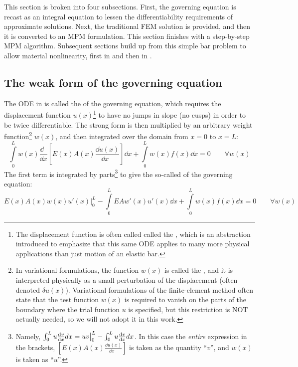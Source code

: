 This section is broken into four subsections. First, the governing equation is recast as an integral equation to lessen the differentiability requirements of approximate solutions. Next, the traditional FEM solution is provided, and then it is converted to an MPM formulation. This section finishes with a step-by-step MPM algorithm.  Subsequent sections build up from this simple \oneD bar problem to allow material nonlinearity, first in \oneD and then in \twoD.

\subsection{The weak form of the governing equation}
The ODE in  is called the  of the governing equation, which requires the displacement function $u(x)$\footnote{The  displacement function is often called called the , which is an abstraction introduced to emphasize that this same ODE applies to many more physical applications than just motion of an elastic bar.} to have no jumps in slope (no cusps) in order to be twice differentiable.  The strong form is then multiplied by an arbitrary weight function\footnote{In variational formulations, the function $w(x)$ is called the , and it is interpreted physically as a small perturbation of the displacement (often denoted $\delta u(x)$).  Variational formulations of the finite-element method often state that the test function $w(x)$ is required to vanish on the parts of the boundary where the trial function $u$ is specified, but this restriction is NOT actually needed, so we will not adopt it in this work.} $w(x)$, and then integrated over the domain from $x=0$ to $x=L$:
\begin{equation}
  \int\limits_0^L w(x) \frac{\dd~~}{\dd x}\left[E(x)A(x) \frac{\dd u(x)}{\dd x~~~}\right]\dd x  +  \int\limits_0^L w(x)f(x)\dd x=0
\qquad\forall w(x)
\end{equation}
The first term is integrated by parts\footnote{Namely, $\int_0^L u \frac{\mathrm{d} {v}}{\mathrm{d} {x}} dx = uv \big|_0^L-\int_0^L u \frac{\mathrm{d} {v}}{\mathrm{d} {x}} dx$. In this case the \emph{entire} expression in the brackets, $\left[E(x)A(x) \frac{\dd u(x)}{\dd x~~~}\right]$ is taken as the quantity ``$v$'', and $w(x)$ is taken as ``$u$''.}  to give the so-called  of the governing equation:
\begin{equation}
  E(x)A(x) w(x)u'(x)\big|_0^L-\int\limits_0^L EA w'(x)u'(x)\dd x  +  \int\limits_0^L w(x)f(x)\dd x=0
\qquad\forall w(x)
\label{eq:LinearBarWeakForm}
\end{equation}
